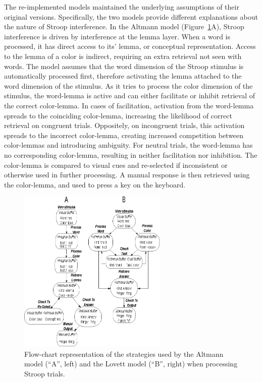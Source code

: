 \documentclass[10pt,letterpaper]{article}
\begin{document}
The re-implemented models maintained the underlying assumptions of their original versions. Specifically, the two models provide different explanations about the nature of Stroop interference. In the Altmann model (Figure~\ref{fig:models}A), Stroop interference is driven by interference at the lemma layer. When a word is processed, it has direct access to its' lemma, or conceptual representation. Access to the lemma of a color is indirect, requiring an extra retrieval not seen with words. The model assumes that the word dimension of the Stroop stimulus is automatically processed first, therefore activating the lemma attached to the word dimension of the stimulus. As it tries to process the color dimension of the stimulus, the word-lemma is active and can either facilitate or inhibit retrieval of the correct color-lemma. In cases of facilitation, activation from the word-lemma spreads to the coinciding color-lemma, increasing the likelihood of correct retrieval on congruent trials. Oppositely, on incongruent trials, this activation spreads to the incorrect color-lemma, creating increased competition between color-lemmas and introducing ambiguity. For neutral trials, the word-lemma has no corresponding color-lemma, resulting in neither facilitation nor inhibition. The color-lemma is compared to visual cues and re-selected if inconsistent or otherwise used in further processing. A manual response is then retrieved using the color-lemma, and used to press a key on the keyboard. 

\begin{figure}[ht]
\centering
  \includegraphics[width=2.8in]{both_models.eps}
  \caption{Flow-chart representation of the strategies used by the Altmann model (``A'', left) and the Lovett model (``B'', right) when processing Stroop trials.}
  \label{fig:models}
\end{figure}%
\end{document}
